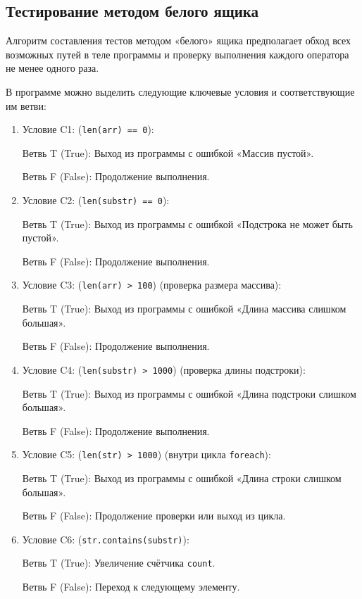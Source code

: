 \documentclass{article}[14pt]
\begin{document}
\subsection{Тестирование методом белого ящика}

Алгоритм составления тестов методом «белого» ящика предполагает обход всех
возможных путей в теле программы и проверку выполнения каждого оператора не
менее одного раза.

В программе можно выделить следующие ключевые условия и соответствующие
им ветви:

\begin{enumerate}
    \item Условие C1: (\texttt{len(arr) == 0}):

        Ветвь T (True): Выход из программы с ошибкой «Массив пустой».

        Ветвь F (False): Продолжение выполнения.

    \item Условие C2: (\texttt{len(substr) == 0}):

        Ветвь T (True): Выход из программы с ошибкой «Подстрока не может быть пустой».

        Ветвь F (False): Продолжение выполнения.

    \item Условие C3: (\texttt{len(arr) > 100}) (проверка размера массива):

        Ветвь T (True): Выход из программы с ошибкой «Длина массива слишком большая».

        Ветвь F (False): Продолжение выполнения.

    \item Условие C4: (\texttt{len(substr) > 1000}) (проверка длины подстроки):

        Ветвь T (True): Выход из программы с ошибкой «Длина подстроки слишком большая».

        Ветвь F (False): Продолжение выполнения.

    \item Условие C5: (\texttt{len(str) > 1000}) (внутри цикла \texttt{foreach}):

        Ветвь T (True): Выход из программы с ошибкой «Длина строки слишком большая».

        Ветвь F (False): Продолжение проверки или выход из цикла.

    \item Условие C6: (\texttt{str.contains(substr)}):

        Ветвь T (True): Увеличение счётчика \texttt{count}.

        Ветвь F (False): Переход к следующему элементу.
\end{enumerate}
\end{document}
